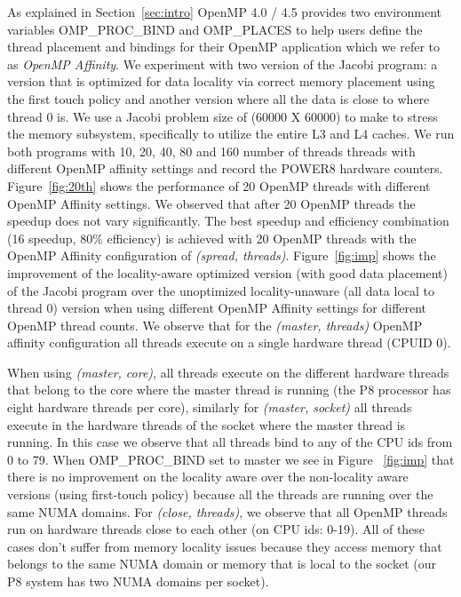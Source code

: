 

As explained in Section~\ref{sec:intro} OpenMP 4.0 / 4.5 provides two environment variables OMP\_PROC\_BIND and OMP\_PLACES to help users define the thread placement and bindings for their OpenMP application which we refer to as \textit{OpenMP Affinity}.
 We experiment with two version of the Jacobi program: a version that is optimized for data locality via correct memory placement using the first touch policy and another version where 
 all the data is close to where thread 0 is.   We use a Jacobi problem size of (60000 X 60000)  to make to stress the memory subsystem, specifically to utilize the entire L3 and L4 caches. We run both programs with 10, 20, 40, 80 and 160  number of threads threads with different OpenMP affinity settings and record the POWER8 hardware counters.
 Figure~\ref{fig:20th} shows the performance of 20 OpenMP threads with different OpenMP Affinity settings. We observed that after 20 OpenMP threads the speedup does not vary significantly. The best speedup and efficiency combination (16 speedup, 80\% efficiency) is achieved with 20 OpenMP threads with the OpenMP Affinity configuration of \textit{(spread, threads)}. Figure~\ref{fig:imp} shows the improvement of the locality-aware optimized version (with good data placement) of the Jacobi program over the unoptimized locality-unaware (all data local to thread 0) version when using different OpenMP Affinity settings for different OpenMP thread counts. 
We observe that for the \textit{(master, threads)} OpenMP affinity configuration all threads execute on a single hardware thread (CPUID 0).
 
 When using \textit{(master, core)}, all threads execute on the different hardware threads that belong to the core where the master thread is running (the P8 processor has eight hardware threads per core), similarly for \textit{(master, socket)} all threads execute in the hardware threads of the socket where the master thread is running. In this case we observe that all threads bind to any of the CPU ids from 0 to 79. When OMP\_PROC\_BIND set to master we see in Figure ~\ref{fig:imp} that there is no improvement on the locality aware over the non-locality aware versions (using first-touch policy) because all the threads are running over the same NUMA domains. For \textit{(close, threads)}, we observe that all OpenMP threads run on hardware threads close to each other (on CPU ids: 0-19). 
All of these cases don't suffer from memory locality issues because they access memory that belongs to the same NUMA domain or memory that is local to the socket (our P8 system has two NUMA domains per socket).

